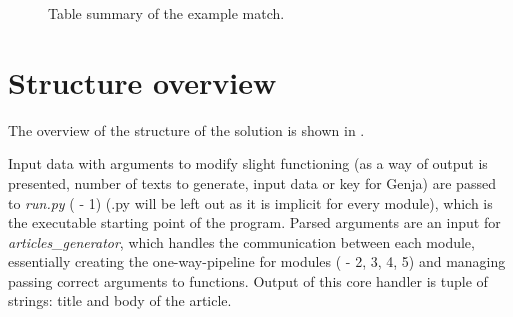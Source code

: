 \begin{figure}[H]
	\caption{Table summary of the example match.}
	\label{fig:overview}
\end{figure}

\section{Structure overview}
The overview of the structure of the solution is shown in .

Input data with arguments to modify slight functioning (as a way of output is presented, number of texts to generate, input data or key for Genja) are passed to \emph{run.py} ( - 1) (.py will be left out as it is implicit for every module), which is the executable starting point of the program. Parsed arguments are an input for \emph{articles\_generator}, which handles the communication between each module, essentially creating the one-way-pipeline for modules ( - 2, 3, 4, 5) and managing passing correct arguments to functions. Output of this core handler is tuple of strings: title and body of the article.


